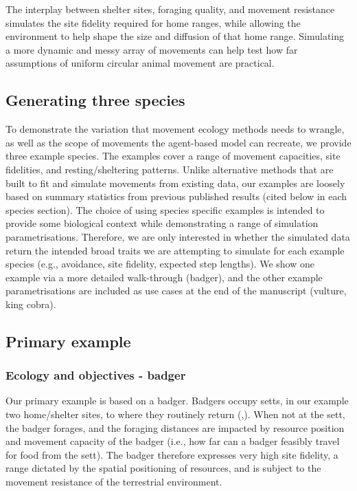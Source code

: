 \documentclass[10pt,a4paper]{article}
\begin{document}
The interplay between shelter sites, foraging quality, and movement resistance simulates the site fidelity required for home ranges, while allowing the environment to help shape the size and diffusion of that home range.
Simulating a more dynamic and messy array of movements can help test how far assumptions of uniform circular animal movement are practical.

\subsection{Generating three species}\label{generating-three-species}

To demonstrate the variation that movement ecology methods needs to wrangle, as well as the scope of movements the agent-based model can recreate, we provide three example species.
The examples cover a range of movement capacities, site fidelities, and resting/sheltering patterns.
Unlike alternative methods that are built to fit and simulate movements from existing data, our examples are loosely based on summary statistics from previous published results (cited below in each species section).
The choice of using species specific examples is intended to provide some biological context while demonstrating a range of simulation parametrisations.
Therefore, we are only interested in whether the simulated data return the intended broad traits we are attempting to simulate for each example species (e.g., avoidance, site fidelity, expected step lengths).
We show one example via a more detailed walk-through (badger), and the other example parametrisations are included as use cases at the end of the manuscript (vulture, king cobra).

\subsection{Primary example}\label{primary-example}

\subsubsection{Ecology and objectives - badger}\label{ecology-and-objectives---badger}

Our primary example is based on a badger.
Badgers occupy setts, in our example two home/shelter sites, to where they routinely return (,).
When not at the sett, the badger forages, and the foraging distances are impacted by resource position and movement capacity of the badger (i.e., how far can a badger feasibly travel for food from the sett).
The badger therefore expresses very high site fidelity, a range dictated by the spatial positioning of resources, and is subject to the movement resistance of the terrestrial environment.
\end{document}
